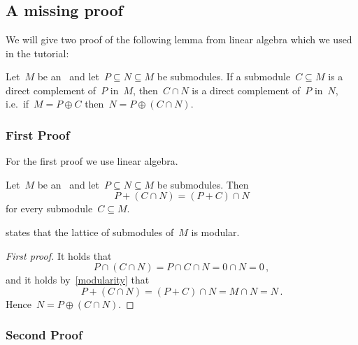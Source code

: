 \section{}





\subsection*{A missing proof}

We will give two proof of the following lemma from linear algebra which we used in the tutorial:

\begin{lemma}
  Let~$M$ be an~{} and let~$P \subseteq N \subseteq M$ be submodules.
  If a submodule~$C \subseteq M$ is a direct complement of~$P$ in~$M$, then~$C \cap N$ is a direct complement of~$P$ in~$N$, i.e.\ if~$M = P \oplus C$ then~$N = P \oplus (C \cap N)$.
\end{lemma}



\subsubsection*{First Proof}

For the first proof we use linear algebra.

\begin{recall}
  \label{modularity}
  Let~$M$ be an~{} and let~$P \subseteq N \subseteq M$ be submodules.
  Then
  \[
      P + (C \cap N)
    = (P + C) \cap N
  \]
  for every submodule~$C \subseteq M$.
\end{recall}

\begin{remark}
   states that the lattice of submodules of~$M$ is modular.
\end{remark}

\begin{proof}[First proof]
  It holds that
  \[
      P \cap (C \cap N)
    = P \cap C \cap N
    = 0 \cap N
    = 0 \,,
  \]
  and it holds by~\cref{modularity} that
  \[
      P + (C \cap N)
    = (P + C) \cap N
    = M \cap N
    = N \,.
  \]
  Hence~$N = P \oplus (C \cap N)$.
\end{proof}



\subsubsection*{Second Proof}

